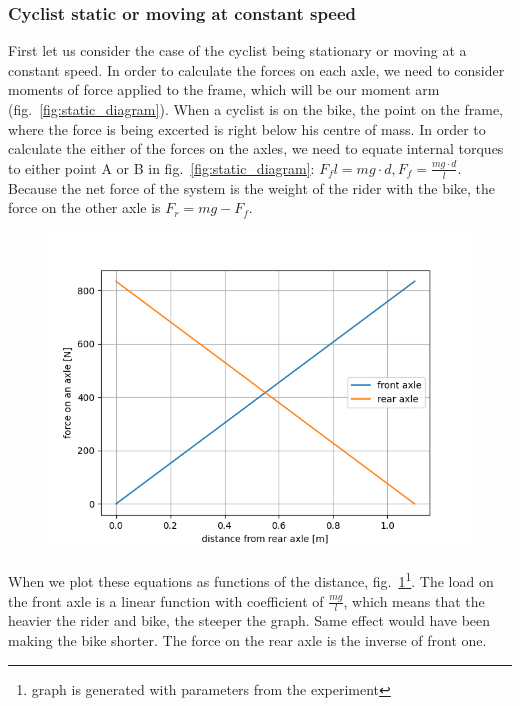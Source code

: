 \documentclass[12pt]{article}
\begin{document}
\subsubsection{Cyclist static or moving at constant speed}
First let us consider the case of the cyclist being stationary or moving at a constant speed. In order to 
calculate the forces on each axle, we need to consider moments of force applied to the frame, which will be
our moment arm (fig.~\ref{fig:static_diagram}). When a cyclist is on the bike, the point on the frame, where
the force is being excerted is right below his centre of mass. In order to calculate the either of the forces 
on the axles, we need to equate internal torques to either point A or B in fig.~\ref{fig:static_diagram}: 
\emph{$F_f l = mg \cdot d, F_f = \frac{mg \cdot d}{l}$}. Because the net force of the system is the weight
of the rider with the bike, the force on the other axle is \emph{$F_r = mg - F_f$}. \\
\begin{figure}[H]
\includegraphics[width=\linewidth]{axles_static_graph}%
\label{fig:static_graph}
\end{figure}
When we plot these equations as functions of the distance, fig.~\ref{fig:static_graph}\footnote[1]{graph is 
generated with parameters from the experiment}. The load on the front axle is a linear function with 
coefficient of $\frac{mg}{l}$, which means that the heavier the rider and bike, the steeper the graph.
Same effect would have been making the bike shorter. The force on the rear axle is the inverse of front one.
\end{document}
